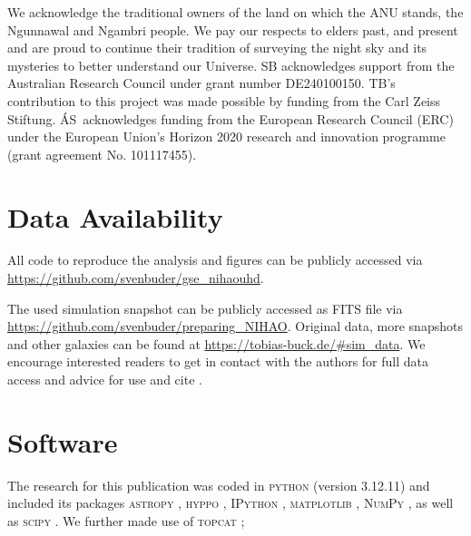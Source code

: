 \documentclass[fleqn,usenatbib]{mnras}
\begin{document}
We acknowledge the traditional owners of the land on which the ANU stands, the Ngunnawal and Ngambri people. We pay our respects to elders past, and present and are proud to continue their tradition of surveying the night sky and its mysteries to better understand our Universe. SB acknowledges support from the Australian Research Council under grant number DE240100150.
TB's contribution to this project was made possible by funding from the Carl Zeiss Stiftung. \'{A}S~acknowledges funding from the European Research Council (ERC) under the European Union’s Horizon 2020 research and innovation programme (grant agreement No. 101117455).

\section*{Data Availability}

All code to reproduce the analysis and figures can be publicly accessed via \url{https://github.com/svenbuder/gse_nihaouhd}.

The used simulation snapshot can be publicly accessed as FITS file via \url{https://github.com/svenbuder/preparing_NIHAO}. Original data, more snapshots and other galaxies can be found at \url{https://tobias-buck.de/#sim_data}. We encourage interested readers to get in contact with the authors for full data access and advice for use and cite \citet{Buck2020b, Buck2021}.

\section*{Software}

The research for this publication was coded in \textsc{python} (version 3.12.11) and included its packages
\textsc{astropy} \citep[v. 7.1.0;][]{Robitaille2013,PriceWhelan2018},
\textsc{hyppo} \citep[v. 0.5.2;][]{hyppo},
\textsc{IPython} \citep[v. 9.1.0;][]{ipython},
\textsc{matplotlib} \citep[v. 3.10.3;][]{matplotlib},
\textsc{NumPy} \citep[v. 2.2.6;][]{numpy}, as well as
\textsc{scipy} \citep[v. 1.16.0;][]{Scipy}.
We further made use of \textsc{topcat} \citep[version 4.7;][]{Taylor2005};
 



\appendix
\end{document}
